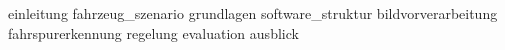 {einleitung}
{fahrzeug_szenario}
{grundlagen}
{software_struktur}
{bildvorverarbeitung}
{fahrspurerkennung}
{regelung}
{evaluation}
{ausblick}
